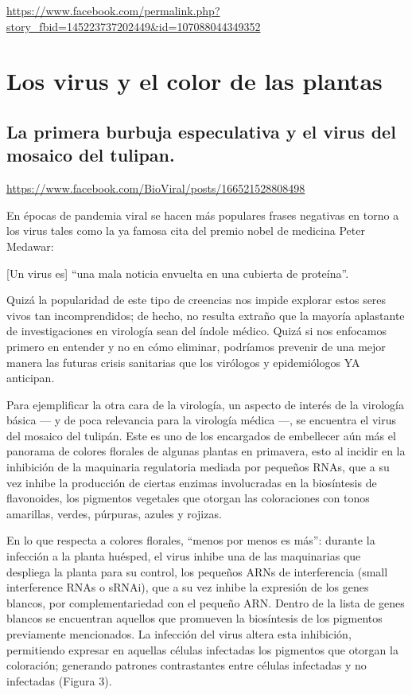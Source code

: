 \documentclass[
  spanish,
]{book}
\begin{document}
\url{https://www.facebook.com/permalink.php?story_fbid=145223737202449\&id=107088044349352}

\hypertarget{los-virus-y-el-color-de-las-plantas}{%
\chapter{Los virus y el color de las plantas}\label{los-virus-y-el-color-de-las-plantas}}

\hypertarget{la-primera-burbuja-especulativa-y-el-virus-del-mosaico-del-tulipan.}{%
\section{La primera burbuja especulativa y el virus del mosaico del tulipan.}\label{la-primera-burbuja-especulativa-y-el-virus-del-mosaico-del-tulipan.}}

\url{https://www.facebook.com/BioViral/posts/166521528808498}

En épocas de pandemia viral se hacen más populares frases negativas en torno a los virus tales como la ya famosa cita del premio nobel de medicina Peter Medawar:

{[}Un virus es{]} ``una mala noticia envuelta en una cubierta de proteína''.

Quizá la popularidad de este tipo de creencias nos impide explorar estos seres vivos tan incomprendidos; de hecho, no resulta extraño que la mayoría aplastante de investigaciones en virología sean del índole médico. Quizá si nos enfocamos primero en entender y no en cómo eliminar, podríamos prevenir de una mejor manera las futuras crisis sanitarias que los virólogos y epidemiólogos YA anticipan.

Para ejemplificar la otra cara de la virología, un aspecto de interés de la virología básica --- y de poca relevancia para la virología médica ---, se encuentra el virus del mosaico del tulipán. Este es uno de los encargados de embellecer aún más el panorama de colores florales de algunas plantas en primavera, esto al incidir en la inhibición de la maquinaria regulatoria mediada por pequeños RNAs, que a su vez inhibe la producción de ciertas enzimas involucradas en la biosíntesis de flavonoides, los pigmentos vegetales que otorgan las coloraciones con tonos amarillas, verdes, púrpuras, azules y rojizas.

En lo que respecta a colores florales, ``menos por menos es más'': durante la infección a la planta huésped, el virus inhibe una de las maquinarias que despliega la planta para su control, los pequeños ARNs de interferencia (small interference RNAs o sRNAi), que a su vez inhibe la expresión de los genes blancos, por complementariedad con el pequeño ARN. Dentro de la lista de genes blancos se encuentran aquellos que promueven la biosíntesis de los pigmentos previamente mencionados. La infección del virus altera esta inhibición, permitiendo expresar en aquellas células infectadas los pigmentos que otorgan la coloración; generando patrones contrastantes entre células infectadas y no infectadas (Figura 3).
\end{document}
